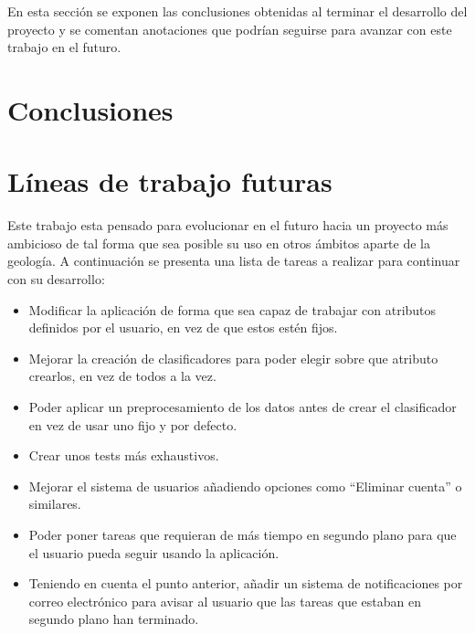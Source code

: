 
En esta sección se exponen las conclusiones obtenidas al terminar el desarrollo del proyecto y se comentan anotaciones que podrían seguirse para avanzar con este trabajo en el futuro.

\section{Conclusiones}

\section{Líneas de trabajo futuras}

Este trabajo esta pensado para evolucionar en el futuro hacia un proyecto más ambicioso de tal forma que sea posible su uso en otros ámbitos aparte de la geología. A continuación se presenta una lista de tareas a realizar para continuar con su desarrollo:
\begin{itemize}
	 \item Modificar la aplicación de forma que sea capaz de trabajar con atributos definidos por el usuario, en vez de que estos estén fijos.
	 \item Mejorar la creación de clasificadores para poder elegir sobre que atributo crearlos, en vez de todos a la vez.
	 \item Poder aplicar un preprocesamiento de los datos antes de crear el clasificador en vez de usar uno fijo y por defecto.
	 \item Crear unos tests más exhaustivos.
	 \item Mejorar el sistema de usuarios añadiendo opciones como ``Eliminar cuenta'' o similares.
	 \item Poder poner tareas que requieran de más tiempo en segundo plano para que el usuario pueda seguir usando la aplicación.
	 \item Teniendo en cuenta el punto anterior, añadir un sistema de notificaciones por correo electrónico para avisar al usuario que las tareas que estaban en segundo plano han terminado.
\end{itemize}

